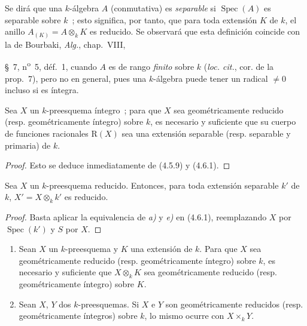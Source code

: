 Se dirá que una $k$-álgebra $A$ (conmutativa) es \emph{separable} si
$\operatorname{Spec}(A)$ es separable sobre $k$~; esto significa, por tanto,
que para toda extensión $K$ de $k$, el anillo $A_{(K)}=A\otimes_k K$ es
reducido. Se observará que esta definición coincide con la de Bourbaki,
\emph{Alg.}, chap.~VIII,


\S~7, n\textsuperscript{o}~5, déf.~1, cuando $A$ es de rango \emph{finito} sobre
$k$ (\emph{loc. cit.}, cor. de la prop.~7), pero no en general, pues una
$k$-álgebra puede tener un radical $\neq0$ incluso si es íntegra.

\begin{corollary}[4.6.3]
\label{IV.2.4.6.3-fr}
Sea $X$ un $k$-preesquema íntegro~; para que $X$ sea geométricamente reducido
\textup{(resp.} geométricamente íntegro\textup{)} sobre $k$, es necesario y suficiente que su
cuerpo de funciones racionales $\mathrm R(X)$ sea una extensión separable
\textup{(resp.} separable y primaria\textup{)} de $k$.
\end{corollary}

\begin{proof}
Esto se deduce inmediatamente de (4.5.9) y (4.6.1).
\end{proof}

\begin{corollary}[4.6.4]
\label{IV.2.4.6.4-fr}
Sea $X$ un $k$-preesquema reducido. Entonces, para toda extensión separable $k'$
de $k$, $X'=X\otimes_k k'$ es reducido.
\end{corollary}

\begin{proof}
Basta aplicar la equivalencia de \emph{a)} y \emph{e)} en (4.6.1), reemplazando $X$ por
$\operatorname{Spec}(k')$ y $S$ por $X$.
\end{proof}

\begin{proposition}[4.6.5]
\label{IV.2.4.6.5-fr}
\begin{enumerate}
\item[\textup{(i)}] Sean $X$ un $k$-preesquema y $K$ una extensión de $k$. Para que $X$
sea geométricamente reducido \textup{(resp.} geométricamente íntegro\textup{)} sobre $k$, es
necesario y suficiente que $X\otimes_k K$ sea geométricamente reducido \textup{(resp.}
geométricamente íntegro\textup{)} sobre $K$.
\item[\textup{(ii)}] Sean $X$, $Y$ dos $k$-preesquemas. Si $X$ e $Y$ son geométricamente
reducidos \textup{(resp.} geométricamente íntegros\textup{)} sobre $k$, lo mismo ocurre con
$X\times_k Y$.
\end{enumerate}
\end{proposition}

